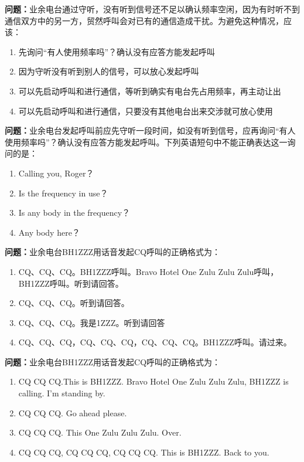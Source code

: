 \documentclass{ctexbook}%
\begin{document}
\textbf{问题：}业余电台通过守听，没有听到信号还不足以确认频率空闲，因为有时听不到通信双方中的另一方，贸然呼叫会对已有的通信造成干扰。为避免这种情况，应该：
\begin{enumerate}[label=\Alph*), leftmargin=3em]
\item 先询问“有人使用频率吗”？确认没有应答方能发起呼叫
\item 因为守听没有听到别人的信号，可以放心发起呼叫
\item 可以先启动呼叫和进行通信，等听到确实有电台先占用频率，再主动让出
\item 可以先启动呼叫和进行通信，只要没有其他电台出来交涉就可放心使用
\end{enumerate}

\textbf{问题：}业余电台发起呼叫前应先守听一段时间，如没有听到信号，应再询问“有人使用频率吗”？确认没有应答方能发起呼叫。下列英语短句中不能正确表达这一询问的是：
\begin{enumerate}[label=\Alph*), leftmargin=3em]
\item Calling you, Roger？
\item Is the frequency in use？
\item Is any body in the frequency？
\item Any body here？
\end{enumerate}

\textbf{问题：}业余电台BH1ZZZ用话音发起CQ呼叫的正确格式为：
\begin{enumerate}[label=\Alph*), leftmargin=3em]
\item CQ、CQ、CQ。BH1ZZZ呼叫。Bravo Hotel One Zulu Zulu Zulu呼叫，BH1ZZZ呼叫。听到请回答。
\item CQ、CQ、CQ。听到请回答。
\item CQ、CQ、CQ。我是1ZZZ。听到请回答
\item CQ、CQ、CQ，CQ、CQ、CQ，CQ、CQ、CQ。BH1ZZZ呼叫。请过来。
\end{enumerate}

\textbf{问题：}业余电台BH1ZZZ用话音发起CQ呼叫的正确格式为：
\begin{enumerate}[label=\Alph*), leftmargin=3em]
\item CQ CQ CQ.This is BH1ZZZ. Bravo Hotel One Zulu Zulu Zulu, BH1ZZZ is calling. I’m standing by.
\item CQ CQ CQ. Go ahead please.
\item CQ CQ CQ. This One Zulu Zulu Zulu. Over.
\item CQ CQ CQ, CQ CQ CQ, CQ CQ CQ. This is BH1ZZZ. Back to you.
\end{enumerate}
\end{document}
